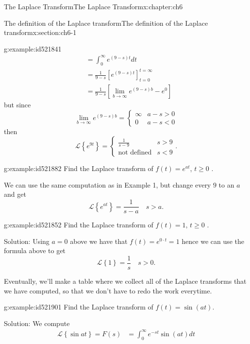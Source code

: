 \documentclass[oneside,10pt,]{book}
\numberwithin{equation}{section}
\numberwithin{equation}{section}
\newcommand{\lt}{<}
\newcommand{\amp}{&}
\begin{document}
\begin{chapterptx}{The Laplace Transform}{}{The Laplace Transform}{}{}{x:chapter:ch6}
\begin{sectionptx}{The definition of the Laplace transform}{}{The definition of the Laplace transform}{}{}{x:section:ch6-1}
\begin{example}{}{g:example:id521841}
\begin{align*}
\amp =\int_{0}^{\infty}e^{(9-s)t}dt\\
\amp =\frac{1}{9-s}\left[e^{(9-s)t}\right]_{t=0}^{t=\infty}\\
\amp =\frac{1}{9-s}\left[\lim_{b\to\infty}e^{(9-s)b}-e^{0}\right]
\end{align*}
but since%
\begin{equation*}
\lim_{b\to\infty}e^{(9-s)b}=\begin{cases}
\infty \amp a-s>0\\
0 \amp a-s\lt 0
\end{cases}
\end{equation*}
then%
\begin{equation*}
\mathcal{L}\left\{ e^{9t}\right\} =\begin{cases}
\frac{1}{s-9} \amp s>9\\
\text{not defined} \amp s\lt 9
\end{cases}.
\end{equation*}
%
\end{example}
\begin{example}{}{g:example:id521882}%
Find the Laplace transform of \(f(t)=e^{at}\), \(t\geq0\) .%
\par
We can use the same computation as in Example 1, but change every \(9\) to an \(a\) and get%
\begin{equation*}
\mathcal{L}\left\{ e^{at}\right\} =\frac{1}{s-a}\,\,\,\,\,\,s>a.
\end{equation*}
%
\end{example}
\begin{example}{}{g:example:id521852}%
Find the Laplace transform of \(f(t)=1\), \(t\geq0\) .%
\par
Solution: Using \(a=0\) above we have that \(f(t)=e^{0\cdot t}=1\) hence we can use the formula above to get%
\begin{equation*}
\mathcal{L}\left\{ 1\right\} =\frac{1}{s}\,\,\,\,\,\,s>0.
\end{equation*}
%
\end{example}
Eventually, we'll make a table where we collect all of the Laplace transforms that we have computed, so that we don't have to redo the work everytime.%
\begin{example}{}{g:example:id521901}%
Find the Laplace transform of \(f(t)=\sin(at)\).%
\par
Solution: We compute%
\begin{align*}
\mathcal{L}\left\{ \sin at\right\} =F(s) \amp =\int_{0}^{\infty}e^{-st}\sin(at)dt\\

\end{align*}
\end{example}
\end{sectionptx}
\end{chapterptx}
\end{document}
